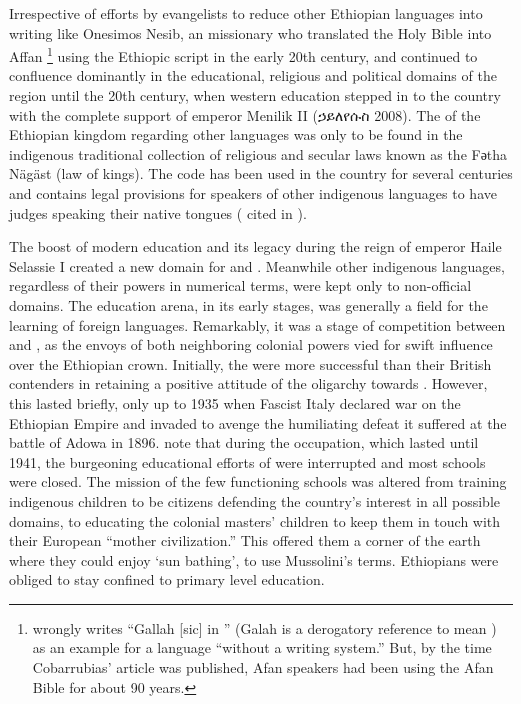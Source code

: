 \documentclass[output=paper,modfonts]{langscibook}
\begin{document}
Irrespective of efforts by evangelists to reduce other Ethiopian languages into writing like Onesimos Nesib, an  missionary who translated the Holy Bible into Affan \footnote{\citet{Cobarrubias1983} wrongly writes “Gallah [sic] in ” (Galah is a derogatory reference to mean ) as an example for a language “without a writing system.” But, by the time Cobarrubias’ article was published, Afan  speakers had been using the Afan  Bible for about 90 years.} using the Ethiopic script in the early 20th century,  and  continued to confluence dominantly in the educational, religious and political domains of the region until the 20th century, when western education stepped in to the country with the complete support of emperor Menilik II ({\amharicfont\footnotesize ኃይለየሱስ} 2008). The  of the Ethiopian kingdom regarding other languages was only to be found in the indigenous traditional collection of religious and secular laws known as the 
Fәtha Nägäst %
(law of kings). The code has been used in the country for several centuries and contains legal provisions for speakers of other indigenous languages to have judges speaking their native tongues (\citealt{Paulos1968} cited in \citealt{Cooper1976}).

The boost of modern education and its legacy during the reign of emperor Haile Selassie I created a new domain for  and . Meanwhile other indigenous languages, regardless of their powers in numerical terms, were kept only to non-official domains. The education arena, in its early stages, was generally a field for the learning of foreign languages. Remarkably, it was a stage of competition between  and , as the envoys of both neighboring colonial powers vied for swift influence over the Ethiopian crown. Initially, the  were more successful than their British contenders in retaining a positive attitude of the oligarchy towards . However, this lasted briefly, only up to 1935 when Fascist Italy declared war on the Ethiopian Empire and invaded to avenge the humiliating defeat it suffered at the battle of Adowa in 1896. \citet[610]{BowenHorn1976} note that during the  occupation, which lasted until 1941, the burgeoning educational efforts of  were interrupted and most schools were closed. The mission of the few functioning schools was altered from training indigenous children to be citizens defending the country’s interest in all possible domains, to educating the colonial masters’  children to keep them in touch with their European “mother civilization.” This offered them a corner of the earth where they could enjoy ‘sun bathing’, to use Mussolini’s terms. Ethiopians were obliged to stay confined to primary level education.
\end{document}
